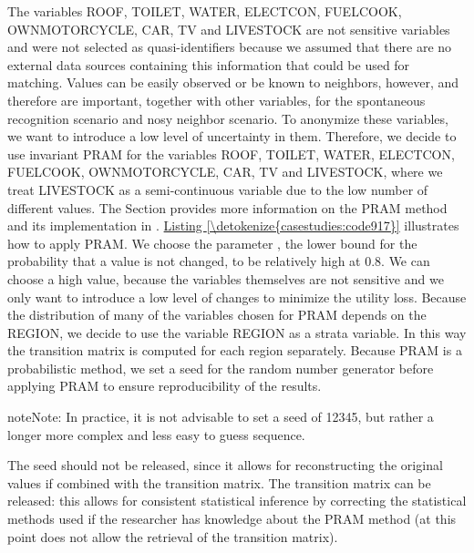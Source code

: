 \documentclass[letterpaper,10pt,english]{sphinxmanual}
\begin{document}
The variables ROOF, TOILET, WATER, ELECTCON, FUELCOOK, OWNMOTORCYCLE,
CAR, TV and LIVESTOCK are not sensitive variables and were not selected
as quasi-identifiers because we assumed that there are no external data
sources containing this information that could be used for matching.
Values can be easily observed or be known to neighbors, however, and
therefore are important, together with other variables, for the
spontaneous recognition scenario and nosy neighbor scenario. To
anonymize these variables, we want to introduce a low level of
uncertainty in them. Therefore, we decide to use invariant PRAM for the
variables ROOF, TOILET, WATER, ELECTCON, FUELCOOK, OWNMOTORCYCLE, CAR,
TV and LIVESTOCK, where we treat LIVESTOCK as a semi-continuous variable
due to the low number of different values.
The Section  provides more
information on the PRAM method and its implementation in .
\hyperref[\detokenize{casestudies:code917}]{Listing \ref{\detokenize{casestudies:code917}}} illustrates how to apply PRAM. We choose the parameter
, the lower bound for the probability that a value is not changed,
to be relatively high at 0.8. We can choose a high value, because the
variables themselves are not sensitive and we only want to introduce a
low level of changes to minimize the utility loss. Because the
distribution of many of the variables chosen for PRAM depends on the
REGION, we decide to use the variable REGION as a strata variable. In
this way the transition matrix is computed for each region separately.
Because PRAM is a probabilistic method, we set a seed for the random
number generator before applying PRAM to ensure reproducibility of the
results.

\begin{sphinxadmonition}{note}{Note:}
In practice, it is not advisable to set a seed of
12345, but rather a longer more complex and less easy to guess
sequence.
\end{sphinxadmonition}

The seed should not be released, since it allows for
reconstructing the original values if combined with the transition
matrix. The transition matrix can be released: this allows for
consistent statistical inference by correcting the statistical methods
used if the researcher has knowledge about the PRAM method (at this
point  does not allow the retrieval of the transition matrix).
\end{document}
